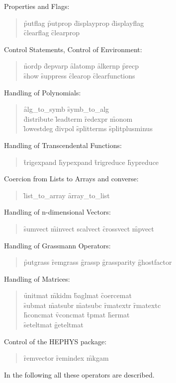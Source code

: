 \begin{itemize}
\item{Properties and Flags:}
\begin{quote}
\f{putflag} \f{putprop} \f{displayprop} \f{displayflag} \\
\f{clearflag} \f{clearprop} 
\end{quote}
\item{Control Statements, Control of Environment:}
\begin{quote}
\f{nordp} \f{depvarp} \f{alatomp} \f{alkernp} \f{precp} \\
\f{show} \f{suppress} \f{clearop} \f{clearfunctions}
\end{quote}
\item{Handling of Polynomials:}
\begin{quote}
\f{alg\_to\_symb} \f{symb\_to\_alg} \\
\f{distribute} \f{leadterm} \f{redexpr} \f{monom} \\
\f{lowestdeg} \f{divpol} \f{splitterms} \f{splitplusminus}
\end{quote}
\item{Handling of Transcendental Functions:}
\begin{quote}
\f{trigexpand} \f{hypexpand} \f{trigreduce} \f{hypreduce}
\end{quote}
\item{Coercion from Lists to Arrays and converse:}
\begin{quote}
\f{list\_to\_array} \f{array\_to\_list}
\end{quote}
\item{Handling of n-dimensional Vectors:}
\begin{quote}
\f{sumvect} \f{minvect scalvect} \f{crossvect} \f{mpvect}
\end{quote}
{\item Handling of Grassmann Operators:}
\begin{quote}
\f{putgrass} \f{remgrass} \f{grassp} \f{grassparity} \f{ghostfactor}
\end{quote}
\item{Handling of Matrices:}
\begin{quote}
\f{unitmat} \f{mkidm} \f{baglmat} \f{coercemat} \\
\f{submat} \f{matsubr} \f{matsubc} \f{rmatextr} \f{rmatextc} \\
\f{hconcmat} \f{vconcmat} \f{tpmat} \f{hermat} \\
\f{seteltmat} \f{geteltmat}
\end{quote}
\item{Control of the HEPHYS package:}
\begin{quote}
\f{remvector} \f{remindex} \f{mkgam}
\end{quote}
\end{itemize}
In the following all these operators are described.
